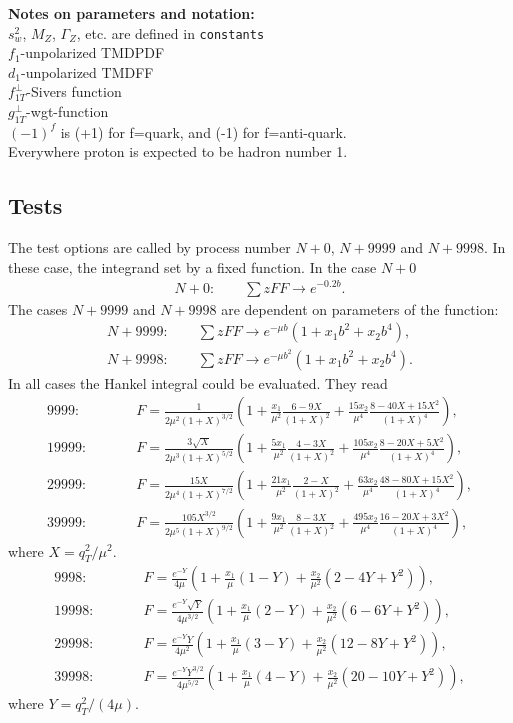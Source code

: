 \documentclass[prd,nofootinbib,eqsecnum,final]{revtex4}
\renewcommand{\(}{\left(}
\renewcommand{\)}{\right)}
\renewcommand{\[}{\left[}
\renewcommand{\]}{\right]}
\begin{document}
\textbf{Notes on parameters and notation:} 
\\
$s_w^2$, $M_Z$, $\Gamma_Z$, etc. are defined in \texttt{constants}
\\
$f_1$-unpolarized TMDPDF
\\
$d_1$-unpolarized TMDFF
\\
$f_{1T}^\perp$-Sivers function
\\
$g_{1T}^\perp$-wgt-function
\\
$(-1)^f$ is (+1) for f=quark, and (-1) for f=anti-quark.
\\
Everywhere proton is expected to be hadron number 1.


\subsection{Tests}
\label{TMDF:tests}

The test options are called by process number $N+0$, $N+9999$ and $N+9998$. In these case, the integrand set by a fixed function. In the case $N+0$
\begin{eqnarray}
N+0:\qquad \sum z FF \to e^{-0.2b}.
\end{eqnarray}
The cases $N+9999$ and $N+9998$ are dependent on parameters of the function:
\begin{eqnarray}
N+9999:\qquad \sum z FF \to e^{-\mu b}(1+x_1 b^2+x_2 b^4),
\\
N+9998:\qquad \sum z FF \to e^{-\mu b^2}(1+x_1 b^2+x_2 b^4).
\end{eqnarray}
In all cases the Hankel integral could be evaluated. They read
\begin{eqnarray}
\text{9999}:&\qquad& F=\frac{1}{2\mu^2(1+X)^{3/2}}\(1+\frac{x_1}{\mu^2}\frac{6-9X}{(1+X)^2}+\frac{15x_2}{\mu^4}\frac{8-40X+15 X^2}{(1+X)^4}\),
\\
\text{19999}:&\qquad& F=\frac{3\sqrt{X}}{2\mu^3(1+X)^{5/2}}\(1+\frac{5x_1}{\mu^2}\frac{4-3X}{(1+X)^2}+\frac{105x_2}{\mu^4}\frac{8-20X+5 X^2}{(1+X)^4}\),
\\
\text{29999}:&\qquad& F=\frac{15 X}{2\mu^4(1+X)^{7/2}}\(1+\frac{21x_1}{\mu^2}\frac{2-X}{(1+X)^2}+\frac{63x_2}{\mu^4}\frac{48-80X+15 X^2}{(1+X)^4}\),
\\
\text{39999}:&\qquad& F=\frac{105 X^{3/2}}{2\mu^5(1+X)^{9/2}}\(1+\frac{9x_1}{\mu^2}\frac{8-3X}{(1+X)^2}+\frac{495x_2}{\mu^4}\frac{16-20X+3 X^2}{(1+X)^4}\),
\end{eqnarray}
where $X=q_T^2/\mu^2$.
\begin{eqnarray}
\text{9998}:&\qquad& F=\frac{e^{-Y}}{4\mu}\(1+\frac{x_1}{\mu}(1-Y)+\frac{x_2}{\mu^2}(2-4Y+Y^2)\),
\\
\text{19998}:&\qquad& F=\frac{e^{-Y}\sqrt{Y}}{4\mu^{3/2}}\(1+\frac{x_1}{\mu}(2-Y)+\frac{x_2}{\mu^2}(6-6Y+Y^2)\),
\\
\text{29998}:&\qquad& F=\frac{e^{-Y}Y}{4\mu^2}\(1+\frac{x_1}{\mu}(3-Y)+\frac{x_2}{\mu^2}(12-8Y+Y^2)\),
\\
\text{39998}:&\qquad& F=\frac{e^{-Y}Y^{3/2}}{4\mu^{5/2}}\(1+\frac{x_1}{\mu}(4-Y)+\frac{x_2}{\mu^2}(20-10Y+Y^2)\),
\end{eqnarray}
where $Y=q_T^2/(4\mu)$.
\end{document}
